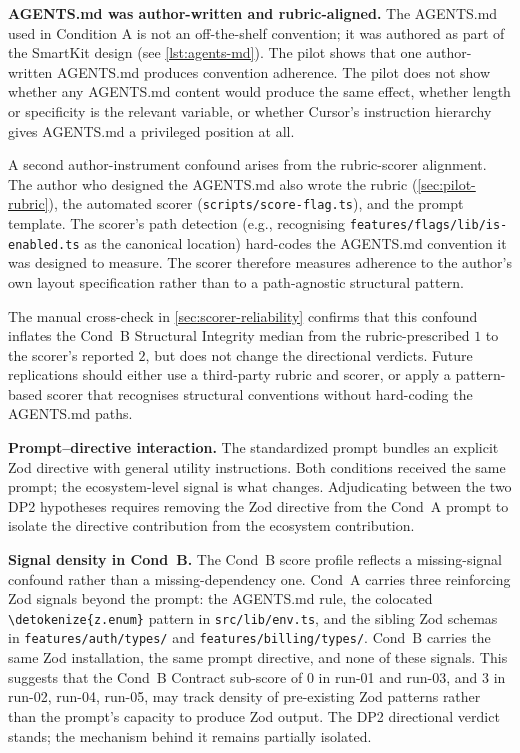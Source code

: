 \documentclass[12pt,a4paper]{report}
\newcommand{\code}[1]{\texttt{\nolinkurl{\detokenize{#1}}}}
\DeclareRobustCommand{\filename}[1]{\bgroup\urlstyle{tt}\nolinkurl{#1}\egroup}
\begin{document}
\textbf{AGENTS.md was author-written and rubric-aligned.} The AGENTS.md used in Condition A is not an off-the-shelf convention; it was authored as part of the SmartKit design (see \autoref{lst:agents-md}). The pilot shows that one author-written AGENTS.md produces convention adherence. The pilot does not show whether any AGENTS.md content would produce the same effect, whether length or specificity is the relevant variable, or whether Cursor's instruction hierarchy gives AGENTS.md a privileged position at all.

A second author-instrument confound arises from the rubric-scorer alignment. The author who designed the AGENTS.md also wrote the rubric (\autoref{sec:pilot-rubric}), the automated scorer (\filename{scripts/score-flag.ts}), and the prompt template. The scorer's path detection (e.g., recognising \filename{features/flags/lib/is-enabled.ts} as the canonical location) hard-codes the AGENTS.md convention it was designed to measure. The scorer therefore measures adherence to the author's own layout specification rather than to a path-agnostic structural pattern.

The manual cross-check in \autoref{sec:scorer-reliability} confirms that this confound inflates the Cond~B Structural Integrity median from the rubric-prescribed $1$ to the scorer's reported $2$, but does not change the directional verdicts. Future replications should either use a third-party rubric and scorer, or apply a pattern-based scorer that recognises structural conventions without hard-coding the AGENTS.md paths.

\textbf{Prompt--directive interaction.} The standardized prompt bundles an explicit Zod directive with general utility instructions. Both conditions received the same prompt; the ecosystem-level signal is what changes. Adjudicating between the two DP2 hypotheses requires removing the Zod directive from the Cond~A prompt to isolate the directive contribution from the ecosystem contribution.

\textbf{Signal density in Cond~B.} The Cond~B score profile reflects a missing-signal confound rather than a missing-dependency one. Cond~A carries three reinforcing Zod signals beyond the prompt: the AGENTS.md rule, the colocated \code{z.enum} pattern in \filename{src/lib/env.ts}, and the sibling Zod schemas in \filename{features/auth/types/} and \filename{features/billing/types/}. Cond~B carries the same Zod installation, the same prompt directive, and none of these signals. This suggests that the Cond~B Contract sub-score of $0$ in run-01 and run-03, and $3$ in run-02, run-04, run-05, may track density of pre-existing Zod patterns rather than the prompt's capacity to produce Zod output. The DP2 directional verdict stands; the mechanism behind it remains partially isolated.
\end{document}
